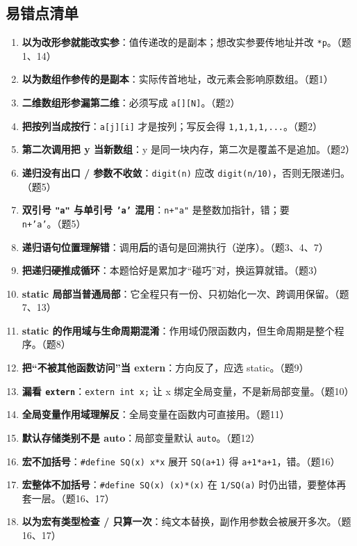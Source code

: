 \documentclass[UTF8,zihao=-4,a4paper]{ctexart}
\begin{document}
\subsection{易错点清单}
\begin{yicuodian}
\begin{enumerate}
  \item \textbf{以为改形参就能改实参}：值传递改的是副本；想改实参要传地址并改 \texttt{*p}。（题1、14）
  \item \textbf{以为数组作参传的是副本}：实际传首地址，改元素会影响原数组。（题1）
  \item \textbf{二维数组形参漏第二维}：必须写成 \texttt{a[][N]}。（题2）
  \item \textbf{把按列当成按行}：\texttt{a[j][i]} 才是按列；写反会得 \texttt{1,1,1,1,...}。（题2）
  \item \textbf{第二次调用把 y 当新数组}：y 是同一块内存，第二次是覆盖不是追加。（题2）
  \item \textbf{递归没有出口 / 参数不收敛}：\texttt{digit(n)} 应改 \texttt{digit(n/10)}，否则无限递归。（题5）
  \item \textbf{双引号 \texttt{"a"} 与单引号 \texttt{'a'} 混用}：\texttt{n+"a"} 是整数加指针，错；要 \texttt{n+'a'}。（题5）
  \item \textbf{递归语句位置理解错}：调用\textbf{后}的语句是回溯执行（逆序）。（题3、4、7）
  \item \textbf{把递归硬推成循环}：本题恰好是累加才“碰巧”对，换运算就错。（题3）
  \item \textbf{static 局部当普通局部}：它全程只有一份、只初始化一次、跨调用保留。（题7、13）
  \item \textbf{static 的作用域与生命周期混淆}：作用域仍限函数内，但生命周期是整个程序。（题8）
  \item \textbf{把“不被其他函数访问”当 extern}：方向反了，应选 static。（题9）
  \item \textbf{漏看 \texttt{extern}}：\texttt{extern int x;} 让 x 绑定全局变量，不是新局部变量。（题10）
  \item \textbf{全局变量作用域理解反}：全局变量在函数内可直接用。（题11）
  \item \textbf{默认存储类别不是 auto}：局部变量默认 \texttt{auto}。（题12）
  \item \textbf{宏不加括号}：\texttt{\#define SQ(x) x*x} 展开 \texttt{SQ(a+1)} 得 \texttt{a+1*a+1}，错。（题16）
  \item \textbf{宏整体不加括号}：\texttt{\#define SQ(x) (x)*(x)} 在 \texttt{1/SQ(a)} 时仍出错，要整体再套一层。（题16、17）
  \item \textbf{以为宏有类型检查 / 只算一次}：纯文本替换，副作用参数会被展开多次。（题16、17）
\end{enumerate}
\end{yicuodian}
\end{document}
